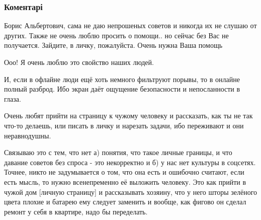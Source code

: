  
 
 
 
 
\subsubsection{Коментарі}

\begin{itemize} %

Борис Альбертович, сама не даю непрошеных советов и никогда их не слушаю от других.
Также не очень люблю просить о помощи.. но сейчас без Вас не получается. Зайдите, в личку, пожалуйста. Очень нужна Ваша помощь








Ооо! Я очень люблю это свойство наших людей.

И, если в офлайне люди ещё хоть немного фильтруют порывы, то в онлайне полный
разброд. Ибо экран даёт ощущение безопасности и непосланности в глаза.

Очень любят прийти на страницу к чужому человеку и рассказать, как ты не так
что-то делаешь, или писать в личку и нарезать задачи, ибо переживают и они
неравнодушны.

Связываю это с тем, что нет а) понятия, что такое личные границы, и что давание
советов без спроса - это некорректно и б) у нас нет культуры в соцсетях.
Точнее, никто не задумывается о том, что она есть и ошибочно считают, если есть
мысль, то нужно всенепременно её выложить человеку. Это как прийти в чужой дом
[личную страницу] и рассказывать хозяину, что у него шторы зелёного цвета
плохие и батарею ему следует заменить и вообще, как фигово он сделал ремонт у
себя в квартире, надо бы переделать.


\end{itemize}
